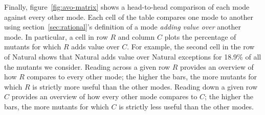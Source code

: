 Finally, figure~\ref{fig:avo-matrix} shows a head-to-head comparison of each mode against every other mode.
Each cell of the table compares one mode to another using section~\ref{sec:rational}'s definition of a mode \emph{adding value over} another mode.
In particular, a cell in row $R$ and column $C$ plots the percentage of mutants for which $R$ adds value over $C$.
For example, the second cell in the row of Natural shows that Natural adds value over Natural exceptions for 18.9\% of all the mutants we consider.
Reading across a given row $R$ provides an overview of how $R$ compares to every other mode;
the higher the bars, the more mutants for which $R$ is strictly more useful than the other modes.
Reading down a given row $C$ provides an overview of how every other mode compares to $C$;
the higher the bars, the more mutants for which $C$ is strictly less useful than the other modes.


